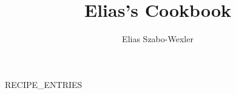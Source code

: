 \documentclass[
a4paper,
11pt
]{article}
\begin{document}
\title{Elias's Cookbook}
\author{Elias Szabo-Wexler}
\maketitle

\tableofcontents
\newpage

{{RECIPE_ENTRIES}}
\end{document}
